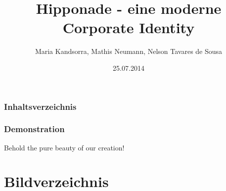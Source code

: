 \documentclass{beamer}
\begin{document}
\title{Hipponade - eine moderne Corporate Identity}  
\author{Maria Kandsorra, Mathis Neumann, Nelson Tavares de Sousa}
\date{25.07.2014} 

\begin{frame}
\titlepage
\end{frame} 

\begin{frame}
\frametitle{Inhaltsverzeichnis}\tableofcontents
\end{frame} 











% 
\begin{frame}
\frametitle{Demonstration} 
Behold the pure beauty of our creation!
\end{frame}

\section{Bildverzeichnis}
\begin{frame}
\listoffigures
\end{frame}
\end{document}
